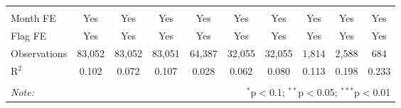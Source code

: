 \begin{table}[!htbp]
\begin{tabular}{@{\extracolsep{1pt}}lccccccccc}
  & & & & & & & & & \\ 
\hline \\[-1.8ex] 
Month FE & Yes & Yes & Yes & Yes & Yes & Yes & Yes & Yes & Yes \\ 
Flag FE & Yes & Yes & Yes & Yes & Yes & Yes & Yes & Yes & Yes \\ 
Observations & 83,052 & 83,052 & 83,051 & 64,387 & 32,055 & 32,055 & 1,814 & 2,588 & 684 \\ 
R$^{2}$ & 0.102 & 0.072 & 0.107 & 0.028 & 0.062 & 0.080 & 0.113 & 0.198 & 0.233 \\ 
\hline 
\hline \\[-1.8ex] 
\textit{Note:}  & \multicolumn{9}{r}{$^{*}$p$<$0.1; $^{**}$p$<$0.05; $^{***}$p$<$0.01} \\ 
\end{tabular} 
\end{table} 
